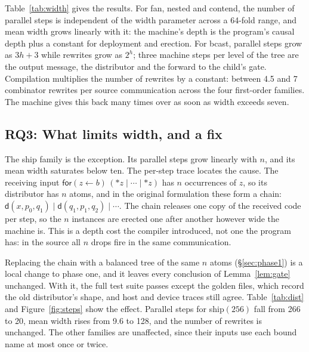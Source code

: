 \documentclass[acmsmall,screen,review,anonymous]{acmart}
\newcommand{\drp}[1]{{*}#1}
\newcommand{\inp}[3]{\mathsf{for}(#1 \leftarrow #2)\,#3}
\newcommand{\dd}{\mathsf{d}}
\begin{document}
Table~\ref{tab:width} gives the results. For fan, nested and contend, the
number of parallel steps is independent of the width parameter across a
64-fold range, and mean width grows linearly with it: the machine's depth is
the program's causal depth plus a constant for deployment and erection. For
bcast, parallel steps grow as $3h+3$ while rewrites grow as $2^{h}$; three
machine steps per level of the tree are the output message, the distributor
and the forward to the child's gate. Compilation multiplies the number of
rewrites by a constant: between 4.5 and 7 combinator rewrites per source
communication across the four first-order families. The machine gives this
back many times over as soon as width exceeds seven.

\subsection{RQ3: What limits width, and a fix}
\label{sec:eval-dist}

The ship family is the exception. Its parallel steps grow linearly with $n$,
and its mean width saturates below ten. The per-step trace locates the cause.
The receiving input $\inp{z}{b}{(\drp{z} \mid \cdots \mid \drp{z})}$ has $n$
occurrences of $z$, so its distributor has $n$ atoms, and in the original
formulation these form a chain: $\dd(x,p_{0},q_{1}) \mid \dd(q_{1},p_{1},q_{2})
\mid \cdots$. The chain releases one copy of the received code per step, so the
$n$ instances are erected one after another however wide the machine is. This
is a depth cost the compiler introduced, not one the program has: in the
source all $n$ drops fire in the same communication.

Replacing the chain with a balanced tree of the same $n$ atoms
(\S\ref{sec:phase1}) is a local change to phase one, and it leaves every
conclusion of Lemma~\ref{lem:gate} unchanged. With it, the full test suite
passes except the golden files, which record the old distributor's shape, and
host and device traces still agree. Table~\ref{tab:dist} and
Figure~\ref{fig:steps} show the effect. Parallel steps for ship$(256)$ fall
from 266 to 20, mean width rises from 9.6 to 128, and the number of rewrites is
unchanged. The other families are unaffected, since their inputs use each
bound name at most once or twice.
\end{document}
